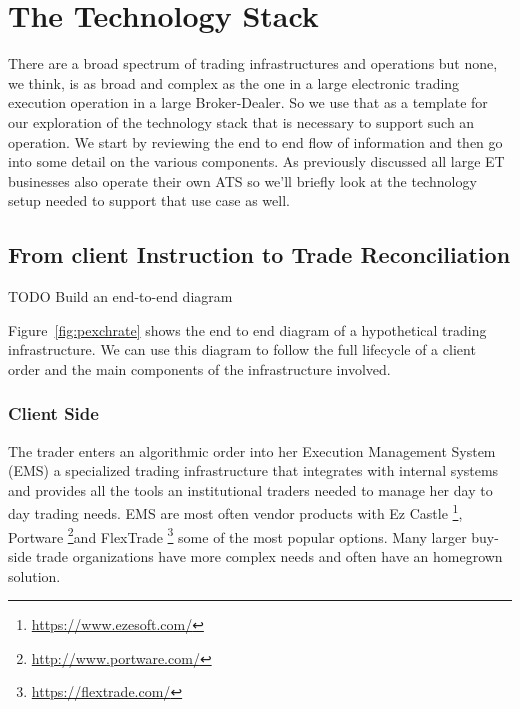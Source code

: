 
\chapter{The Technology Stack}
There are a broad spectrum of trading infrastructures and operations but none, we think, is as broad and complex as the one in a large electronic trading execution operation in a large Broker-Dealer. So we use that as a template for our exploration of the technology stack that is necessary to support such an operation. We start by reviewing the end to end flow of information and then go into some detail on the various components. As previously discussed all large ET businesses also operate their own ATS so we'll briefly look at the technology setup needed to support that use case as well.
\section{From client Instruction to Trade Reconciliation}
TODO Build an end-to-end diagram

Figure~\ref{fig:pexchrate} shows the end to end diagram of a hypothetical trading infrastructure. We can use this diagram to follow the full lifecycle of a client order and the main components of the infrastructure involved.
\subsection{Client Side}
The trader enters an algorithmic order into her Execution Management System (EMS) a specialized trading infrastructure that integrates with internal systems and provides all the tools an institutional traders needed to manage her day to day trading needs. EMS are most often vendor products with Ez Castle \footnote{\url{https://www.ezesoft.com/}}, Portware \footnote{\url{http://www.portware.com/}}and FlexTrade \footnote{\url{https://flextrade.com/}} some of the most popular options. Many larger buy-side trade organizations have more complex needs and often have an homegrown solution.\\

